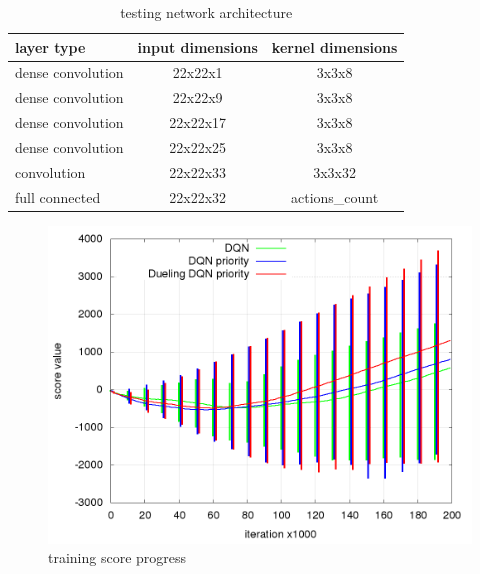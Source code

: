 \documentclass[10pt,a4paper]{article}
\begin{document}
\begin{table}[]
\centering
\begin{tabular}{|l|c|c|}
\hline
\textbf{layer type}                       & \textbf{input dimensions} & \textbf{kernel dimensions} \\ \hline
\cellcolor[HTML]{CBCEFB}dense convolution & 22x22x1                   & 3x3x8                      \\ \hline
\cellcolor[HTML]{CBCEFB}dense convolution & 22x22x9                  & 3x3x8                      \\ \hline
\cellcolor[HTML]{CBCEFB}dense convolution & 22x22x17                  & 3x3x8                      \\ \hline
\cellcolor[HTML]{CBCEFB}dense convolution & 22x22x25                  & 3x3x8                      \\ \hline
\cellcolor[HTML]{67FD9A}convolution       & 22x22x33                  & 3x3x32                     \\ \hline
\cellcolor[HTML]{FD6864}full connected    & 22x22x32                  & actions\_count             \\ \hline
\end{tabular}
\caption{testing network architecture}
\label{tab:dqn_test_network_architecture}
\end{table}

\begin{figure}[!htb]
  \centering
  \includegraphics[scale=0.4]{../../rl_results/dqn_test/rl_progress_training.png}
  \caption{training score progress}
  \label{img:dqn_test_training_progress}
\end{figure}
\end{document}

